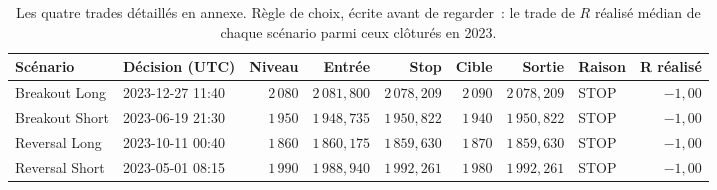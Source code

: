 \begin{table}[htbp]
\centering
\scriptsize
\setlength{\tabcolsep}{4pt}
\caption{Les quatre trades détaillés en annexe. Règle de choix, écrite avant de regarder~: le trade de $R$ réalisé médian de chaque scénario parmi ceux clôturés en 2023.}
\label{tab:x10_trade_examples}
\begin{tabular}{l l r r r r r l r}
\toprule
\textbf{Scénario} & \textbf{Décision (UTC)} & \textbf{Niveau} & \textbf{Entrée} & \textbf{Stop} & \textbf{Cible} & \textbf{Sortie} & \textbf{Raison} & \textbf{R réalisé} \\
\midrule
Breakout Long & 2023-12-27 11:40 & $2\,080$ & $2\,081{,}800$ & $2\,078{,}209$ & $2\,090$ & $2\,078{,}209$ & STOP & $-1{,}00$ \\
Breakout Short & 2023-06-19 21:30 & $1\,950$ & $1\,948{,}735$ & $1\,950{,}822$ & $1\,940$ & $1\,950{,}822$ & STOP & $-1{,}00$ \\
Reversal Long & 2023-10-11 00:40 & $1\,860$ & $1\,860{,}175$ & $1\,859{,}630$ & $1\,870$ & $1\,859{,}630$ & STOP & $-1{,}00$ \\
Reversal Short & 2023-05-01 08:15 & $1\,990$ & $1\,988{,}940$ & $1\,992{,}261$ & $1\,980$ & $1\,992{,}261$ & STOP & $-1{,}00$ \\
\bottomrule
\end{tabular}
\end{table}
